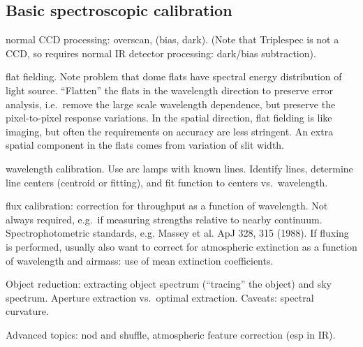 \documentclass{article}
\begin{document}
\subsection*{Basic spectroscopic calibration}
\begin{enumerate*}
    \item normal CCD processing: overscan, (bias, dark). (Note that
        Triplespec is not a CCD, so requires normal IR detector
        processing: dark/bias subtraction).
    \item
        flat fielding. Note problem that dome flats have spectral
        energy distribution of light source. ``Flatten'' the flats in
        the wavelength direction to preserve error analysis, i.e.\
        remove the large scale wavelength dependence, but preserve the
        pixel-to-pixel response variations. In the spatial direction,
        flat fielding is like imaging, but often the requirements on
        accuracy are less stringent. An extra spatial component in the
        flats comes from variation of slit width.
    \item wavelength calibration. Use arc lamps with known lines.
        Identify lines, determine line centers (centroid or fitting),
        and fit function to centers vs.\ wavelength.
    \item flux calibration: correction for throughput as a function of
        wavelength. Not always required, e.g.\ if measuring strengths
        relative to nearby continuum. Spectrophotometric standards,
        e.g. Massey et al. ApJ 328, 315 (1988).
        If fluxing is performed, usually also want to correct for
        atmospheric extinction as a function of wavelength and
        airmass: use of mean extinction coefficients.
    \item Object reduction: extracting object spectrum (``tracing'' the
        object) and sky spectrum. Aperture extraction vs.\ optimal
        extraction. Caveats: spectral curvature.
    \item Advanced topics: nod and shuffle, atmospheric feature
        correction (esp in IR).
\end{enumerate*}
\end{document}
